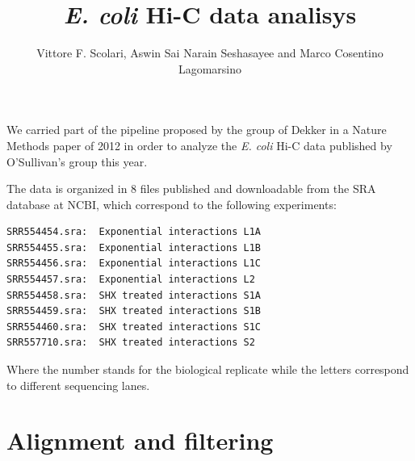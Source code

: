 \documentclass[12pt,a4paper,notitlepage]{article}
\newcommand{\ecoli}{\emph{E. coli}\xspace}
\begin{document}
\title{\ecoli Hi-C data analisys}
\author{Vittore F. Scolari, Aswin Sai Narain Seshasayee and Marco
  Cosentino Lagomarsino}
\maketitle

We carried part of the pipeline proposed by the group of Dekker in
a Nature Methods paper of 2012 \cite{Imakaev2012} in order to analyze
the \ecoli Hi-C data published by O'Sullivan's group this
year\cite{Cagliero2013}.

The data is organized in 8 files published and downloadable from the
SRA database at NCBI, which correspond to the following experiments:
\begin{verbatim}
SRR554454.sra:  Exponential interactions L1A
SRR554455.sra:  Exponential interactions L1B
SRR554456.sra:  Exponential interactions L1C
SRR554457.sra:  Exponential interactions L2
SRR554458.sra:  SHX treated interactions S1A
SRR554459.sra:  SHX treated interactions S1B
SRR554460.sra:  SHX treated interactions S1C
SRR557710.sra:  SHX treated interactions S2
\end{verbatim}
Where the number stands for the biological replicate while the letters
correspond to different sequencing lanes.

\section{Alignment and filtering}
\end{document}

